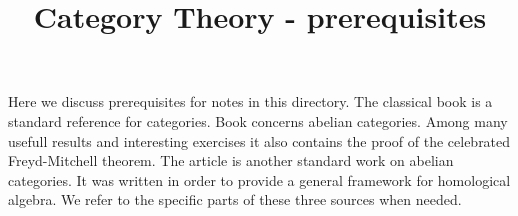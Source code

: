 



\title{Category Theory - prerequisites}
\date{}
\maketitle
\noindent
Here we discuss prerequisites for notes in this directory. The classical book \cite{Maclane} is a standard reference for categories. Book \cite{freyd1962abelian} concerns abelian categories. Among many usefull results and interesting exercises it also contains the proof of the celebrated Freyd-Mitchell theorem. The article \cite{grothendieck1957} is another standard work on abelian categories. It was written in order to provide a general framework for homological algebra. We refer to the specific parts of these three sources when needed. 

\small


